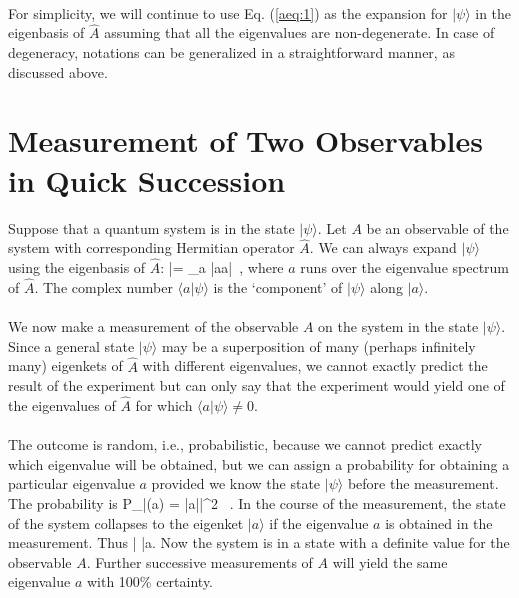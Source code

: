 \paragraph{}
For simplicity, we will continue to use Eq. (\ref{aeq:1}) as the expansion for $|\psi\rangle$ in the eigenbasis of $\hat{A}$
assuming that all the eigenvalues are non-degenerate. In case of degeneracy, notations can be generalized in a straightforward manner, as discussed above.			



\section{Measurement of Two Observables in Quick Succession}
Suppose that a quantum system is in the state $|\psi\rangle$. Let $A$ be an observable of the system with corresponding Hermitian operator $\hat{A}$. We can always expand $|\psi\rangle$ using the eigenbasis of $\hat{A}$:
\be
|\psi\rangle = \sum_a |a\rangle \langle a|\psi\rangle \, ,
\ee
where $a$ runs over the eigenvalue spectrum of $\hat{A}$. The complex number $\langle a |\psi\rangle$ is the `component' of 
$|\psi\rangle$ along $|a\rangle$. 

\paragraph{}
We now make a measurement of the observable $A$ on the system in the state $|\psi\rangle$. Since a general state $|\psi\rangle$
may be a superposition of many (perhaps infinitely many) eigenkets of $\hat{A}$ with different eigenvalues, we cannot exactly 
predict the result of the experiment but can only say that the experiment would yield one of the eigenvalues 
of $\hat{A}$ for which $\langle a|\psi\rangle \neq 0$. 

\paragraph{}
The outcome is random, i.e., probabilistic, because we cannot predict exactly which eigenvalue will be obtained, but we can assign a probability for obtaining a particular eigenvalue $a$ provided we know the state $|\psi\rangle$ before the measurement.
The probability is
\be
P_{|\psi\rangle}(a) = \left|\langle a|\psi\rangle \right|^2 \, . 
\ee
In the course of the measurement, the state of the system collapses to the eigenket $|a\rangle$ if the eigenvalue $a$ is obtained in the measurement. Thus
\be
|\psi\rangle\;\; \;\; |a\rangle.
\ee
Now the system is in a state with a definite value for the observable $A$. Further successive measurements of $A$ will yield the same eigenvalue $a$ with 100\% certainty. 

